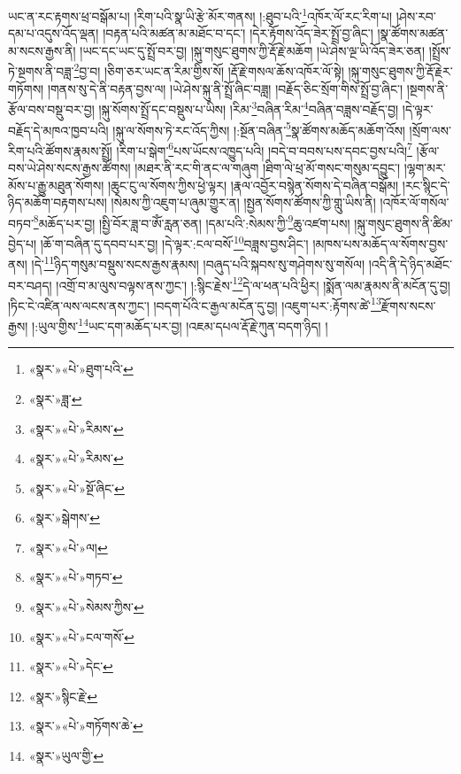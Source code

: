 ཡང་ན་རང་རྟགས་ཕྲ་བསྒོམ་པ། །རིག་པའི་སྣ་ཡི་རྩེ་མོར་གནས། །:ཐུབ་པའི་\footnote{«སྣར་»«པེ་»ཐུག་པའི་}འཁོར་ལོ་རང་རིག་པ། །ཤེས་རབ་དམ་པ་འདུས་འོད་ལྡན། །བརྟན་པའི་མཚན་མ་མཐོང་བ་དང་། །དེར་རྟོགས་འོད་ཟེར་སྤྲོ་བྱ་ཞིང་། །སྣ་ཚོགས་མཚན་མ་སངས་རྒྱས་ནི། །ཡང་དང་ཡང་དུ་སྤྲོ་བར་བྱ། །སྐུ་གསུང་ཐུགས་ཀྱི་རྡོ་རྗེ་མཆོག །ཡེ་ཤེས་ལྔ་ཡི་འོད་ཟེར་ཅན། །སྤྲོས་ཏེ་སྔགས་ནི་བཟླ་\footnote{«སྣར་»ཟླ་}བྱ་བ། །ཅིག་ཅར་ཡང་ན་རིམ་གྱིས་སོ། །རྡོ་རྗེ་གསལ་ཆོས་འཁོར་ལོ་སྟེ། །སྐུ་གསུང་ཐུགས་ཀྱི་རྡོ་རྗེར་གཏོགས། །གནས་སུ་དེ་ནི་བརྟན་བྱས་ལ། །ཡེ་ཤེས་སྐུ་ནི་སྤྲོ་ཞིང་བཟླ། །བརྗོད་ཅིང་སྲོག་གིས་སྤྲོ་བྱ་ཞིང་། །སྔགས་ནི་རྩོལ་བས་བསྡུ་བར་བྱ། །སྐུ་སོགས་སྤྲོ་དང་བསྡུས་པ་ཡིས། །རིམ་\footnote{«སྣར་»«པེ་»རིམས་}བཞིན་རིམ་\footnote{«སྣར་»«པེ་»རིམས་}བཞིན་བཟླས་བརྗོད་བྱ། །དེ་ལྟར་བརྗོད་དེ་མཁའ་ཁྱབ་པའི། །སྐུ་ལ་སོགས་ཏེ་རང་འོད་ཀྱིས། །:སྔོན་བཞིན་\footnote{«སྣར་»«པེ་»སྔོ་ཞིང་}སྣ་ཚོགས་མཆོད་མཆོག་འོས། །སྲོག་ལས་རིག་པའི་ཚོགས་རྣམས་སྤྲོ། །རིག་པ་སྒེག་\footnote{«སྣར་»སྒེགས་}པས་ཡོངས་འཁྱུད་པའི། །བདེ་བ་བབས་པས་དབང་བྱས་པའི།\footnote{«སྣར་»«པེ་»ལ།} །རྩོལ་བས་ཡེ་ཤེས་སངས་རྒྱས་ཚོགས། །མཐར་ནི་རང་གི་ནང་ལ་གཞུག །ཐིག་ལེ་ཕྲ་མོ་གསང་གསུམ་དབྱུང་། །ལྷག་མར་མོས་པ་རྒྱུ་མཐུན་སོགས། །ཆུང་ངུ་ལ་སོགས་ཀྱིས་ཕྱེ་ལྟར། །རྣལ་འབྱོར་བསྙེན་སོགས་དེ་བཞིན་བསྒོམ། །རང་སྙིང་དེ་ཉིད་མཆོག་བརྟགས་པས། །སེམས་ཀྱི་འཇུག་པ་ཞུམ་གྱུར་ན། །སྤྱན་སོགས་ཚོགས་ཀྱི་གླུ་ཡིས་ནི། །འཁོར་ལོ་གསོལ་བཏབ་\footnote{«སྣར་»«པེ་»གཏབ་}མཆོད་པར་བྱ། །སྤྱི་བོར་ཟླ་བ་ཨོཾ་རླན་ཅན། །དམ་པའི་:སེམས་ཀྱི་\footnote{«སྣར་»«པེ་»སེམས་ཀྱིས་}ཆུ་འཛག་པས། །སྐུ་གསུང་ཐུགས་ནི་ཚིམ་བྱེད་པ། །ཆོ་ག་བཞིན་དུ་དབབ་པར་བྱ། །དེ་ལྟར་:ངལ་བསོ་\footnote{«སྣར་»«པེ་»ངལ་གསོ་}བཟླས་བྱས་ཤིང་། །མཁས་པས་མཆོད་ལ་སོགས་བྱས་ནས། །དེ་\footnote{«སྣར་»«པེ་»དེང་}ཉིད་གསུམ་བསྡུས་སངས་རྒྱས་རྣམས། །བཞུད་པའི་སྐབས་སུ་གཤེགས་སུ་གསོལ། །འདི་ནི་དེ་ཉིད་མཐོང་བར་བཤད། །འགྲོ་བ་མ་ལུས་བལྟས་ནས་ཀྱང་། །:སྙིང་རྗེས་\footnote{«སྣར་»སྙིང་རྗེ་}དེ་ལ་ཕན་པའི་ཕྱིར། །སྨོན་ལམ་རྣམས་ནི་མངོན་དུ་བྱ། །ཏིང་ངེ་འཛིན་ལས་ལངས་ནས་ཀྱང་། །བདག་པོའི་ང་རྒྱལ་མངོན་དུ་བྱ། །འཇུག་པར་:རྟོགས་ཚེ་\footnote{«སྣར་»«པེ་»གཏོགས་ཆེ་}རྫོགས་སངས་རྒྱས། །:ཡུལ་གྱིས་\footnote{«སྣར་»ཡུལ་གྱི་}ཡང་དག་མཆོད་པར་བྱ། །འཇམ་དཔལ་རྡོ་རྗེ་ཀུན་བདག་ཉིད། །
